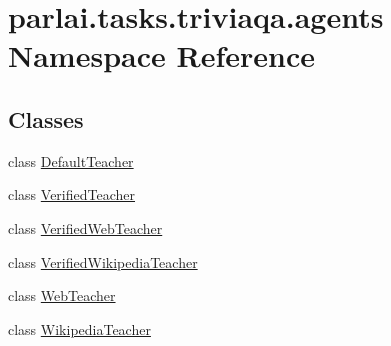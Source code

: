 \hypertarget{namespaceparlai_1_1tasks_1_1triviaqa_1_1agents}{}\section{parlai.\+tasks.\+triviaqa.\+agents Namespace Reference}
\label{namespaceparlai_1_1tasks_1_1triviaqa_1_1agents}
\subsection*{Classes}
\begin{DoxyCompactItemize}
\item 
class \hyperlink{classparlai_1_1tasks_1_1triviaqa_1_1agents_1_1DefaultTeacher}{Default\+Teacher}
\item 
class \hyperlink{classparlai_1_1tasks_1_1triviaqa_1_1agents_1_1VerifiedTeacher}{Verified\+Teacher}
\item 
class \hyperlink{classparlai_1_1tasks_1_1triviaqa_1_1agents_1_1VerifiedWebTeacher}{Verified\+Web\+Teacher}
\item 
class \hyperlink{classparlai_1_1tasks_1_1triviaqa_1_1agents_1_1VerifiedWikipediaTeacher}{Verified\+Wikipedia\+Teacher}
\item 
class \hyperlink{classparlai_1_1tasks_1_1triviaqa_1_1agents_1_1WebTeacher}{Web\+Teacher}
\item 
class \hyperlink{classparlai_1_1tasks_1_1triviaqa_1_1agents_1_1WikipediaTeacher}{Wikipedia\+Teacher}
\end{DoxyCompactItemize}
